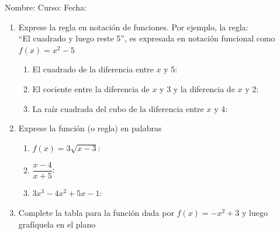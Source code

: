\documentclass[fleqn]{article}
\newcommand{\LineaNombre}{%
\par
\vspace{\baselineskip}
Nombre:\hrulefill \; Curso: \underline{\hspace*{48pt}} \; Fecha: \underline{\hspace*{2.5cm}} \relax
\par}
\begin{document}
\LineaNombre
\begin{enumerate}
 \item Exprese la regla en notación de funciones. Por ejemplo, la regla:\\
  ``El cuadrado y luego reste 5'', es expresada en notación funcional como $f(x)=x^{2}-5$
 \begin{enumerate}
  \item El cuadrado de la diferencia entre $x$ y 5: \dotfill
  \item El cociente entre la diferencia de $x$ y 3 y la diferencia de $x$ y 2: \dotfill
  \item La raíz cuadrada del cubo de la diferencia entre $x$ y 4: \dotfill
 \end{enumerate}
\item Exprese la función (o regla) en palabras
\begin{enumerate}
 \item $f(x)=3\sqrt{x-3}$: \dotfill
 \item $\dfrac{x-4}{x+5}$: \dotfill
 \item $3x^{3}-4x^{2}+5x-1$: \dotfill
\end{enumerate}
\item Complete la tabla para la función dada por $f(x)=-x^{2}+3$ y luego grafíquela en el plano


\end{enumerate}
\end{document}
